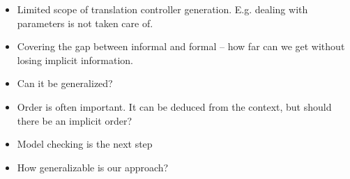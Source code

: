 \begin{itemize}
  \item Limited scope of translation controller generation. E.g. dealing with
  parameters is not taken care of.
  \item Covering the gap between informal and formal -- how far can we get
  without losing implicit information.
  \item Can it be generalized?
  \item Order is often important. It can be deduced from the context, but should
  there be an implicit order?
  \item Model checking is the next step
  \item How generalizable is our approach?
\end{itemize}

